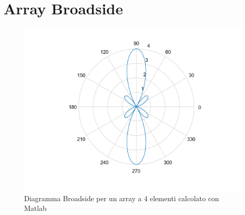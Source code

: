 \documentclass[twoside,twocolumn]{article}
\begin{document}
\section{Array Broadside}
\begin{figure}[h!]
  \includegraphics[width=\linewidth]{Array4E_matlab}
  \caption{Diagramma Broadside per un array a 4 elementi calcolato con Matlab}
  \label{fig:Array4E_matlab}
\end{figure}
\end{document}
